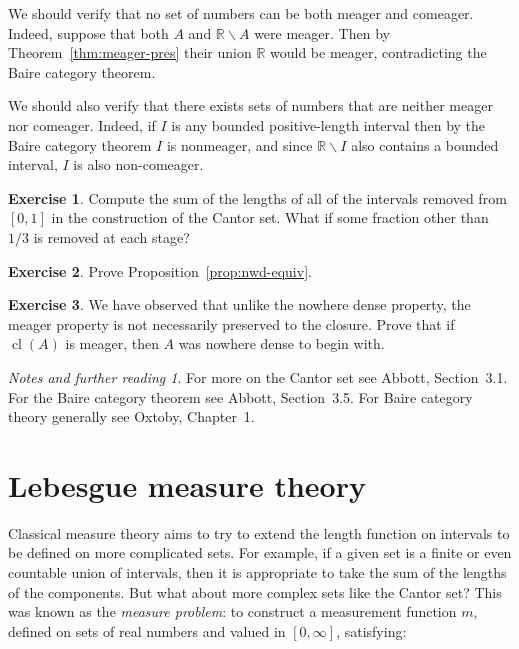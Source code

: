 \documentclass[11pt,oneside]{amsbook}
\newcommand{\R}{\mathbb R}
\DeclareMathOperator{\cl}{cl}
\theoremstyle{definition}
\newtheorem{exercise}{Exercise}[section]
\theoremstyle{plain}
\theoremstyle{definition}
\theoremstyle{remark}
\newtheorem*{notes}{Notes and further reading}
\numberwithin{equation}{section}
\numberwithin{figure}{section}
\begin{document}
We should verify that no set of numbers can be both meager and comeager. Indeed, suppose that both $A$ and $\R\smallsetminus A$ were meager. Then by Theorem~\ref{thm:meager-pres} their union $\R$ would be meager, contradicting the Baire category theorem.

We should also verify that there exists sets of numbers that are neither meager nor comeager. Indeed, if $I$ is any bounded positive-length interval then by the Baire category theorem $I$ is nonmeager, and since $\R\smallsetminus I$ also contains a bounded interval, $I$ is also non-comeager.

\begin{exercise}
  \label{exerc:cantor}
  Compute the sum of the lengths of all of the intervals removed from $[0,1]$ in the construction of the Cantor set. What if some fraction other than $1/3$ is removed at each stage?
\end{exercise}

\begin{exercise}
  \label{exerc:nwd-equiv}
  Prove Proposition~\ref{prop:nwd-equiv}.
\end{exercise}

\begin{exercise}
  We have observed that unlike the nowhere dense property, the meager property is not necessarily preserved to the closure. Prove that if $\cl(A)$ is meager, then $A$ was nowhere dense to begin with.
\end{exercise}

\begin{notes}
  For more on the Cantor set see Abbott, Section~3.1. For the Baire category theorem see Abbott, Section~3.5. For Baire category theory generally see Oxtoby, Chapter~1.
\end{notes}


\newpage
\section{Lebesgue measure theory}

Classical measure theory aims to try to extend the length function on intervals to be defined on more complicated sets. For example, if a given set is a finite or even countable union of intervals, then it is appropriate to take the sum of the lengths of the components. But what about more complex sets like the Cantor set? This was known as the \emph{measure problem}: to construct a measurement function $m$, defined on sets of real numbers and valued in $[0,\infty]$, satisfying:
\end{document}
